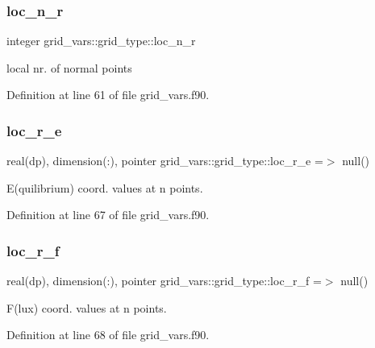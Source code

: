 \subsubsection{\texorpdfstring{loc\+\_\+n\+\_\+r}{loc\_n\_r}}
{\footnotesize\ttfamily integer grid\+\_\+vars\+::grid\+\_\+type\+::loc\+\_\+n\+\_\+r}



local nr. of normal points 



Definition at line 61 of file grid\+\_\+vars.\+f90.

\mbox{\label{structgrid__vars_1_1grid__type_a898df4540526374d3f749fdbf6e0068b}} 
\subsubsection{\texorpdfstring{loc\+\_\+r\+\_\+e}{loc\_r\_e}}
{\footnotesize\ttfamily real(dp), dimension(\+:), pointer grid\+\_\+vars\+::grid\+\_\+type\+::loc\+\_\+r\+\_\+e =$>$ null()}



E(quilibrium) coord. values at n points. 



Definition at line 67 of file grid\+\_\+vars.\+f90.

\mbox{\label{structgrid__vars_1_1grid__type_afcc03f0dce24d88dfa0ae8e725238d4c}} 
\subsubsection{\texorpdfstring{loc\+\_\+r\+\_\+f}{loc\_r\_f}}
{\footnotesize\ttfamily real(dp), dimension(\+:), pointer grid\+\_\+vars\+::grid\+\_\+type\+::loc\+\_\+r\+\_\+f =$>$ null()}



F(lux) coord. values at n points. 



Definition at line 68 of file grid\+\_\+vars.\+f90.

